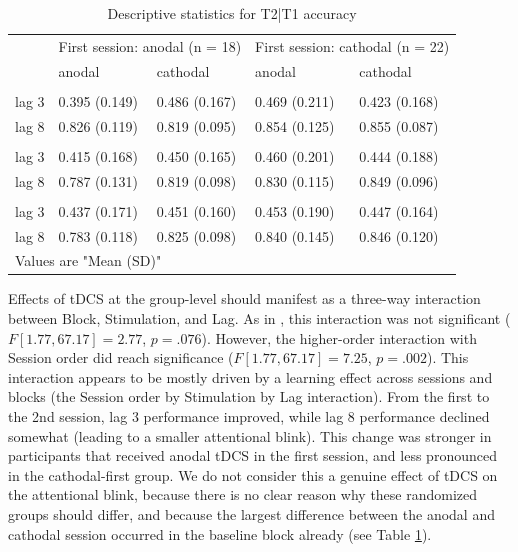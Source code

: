 \documentclass[11pt,english,]{memoir}
\begin{document}
\begin{table}[t]

\caption{\label{tab:tab-descriptives-T2}Descriptive statistics for T2|T1 accuracy}
\centering
\fontsize{10}{12}\selectfont
\begin{tabular}{lllll}
\toprule
\multicolumn{1}{c}{ } & \multicolumn{2}{c}{First session: anodal (n = 18)} & \multicolumn{2}{c}{First session: cathodal (n = 22)} \\
\cmidrule(l{3pt}r{3pt}){2-3} \cmidrule(l{3pt}r{3pt}){4-5}
 & anodal & cathodal & anodal & cathodal\\
\midrule
\addlinespace[0.3em]
\multicolumn{5}{l}{\textbf{baseline}}\\
\hspace{1em}lag 3 & 0.395 (0.149) & 0.486 (0.167) & 0.469 (0.211) & 0.423 (0.168)\\
\hspace{1em}lag 8 & 0.826 (0.119) & 0.819 (0.095) & 0.854 (0.125) & 0.855 (0.087)\\
\addlinespace[0.3em]
\multicolumn{5}{l}{\textbf{tDCS}}\\
\hspace{1em}lag 3 & 0.415 (0.168) & 0.450 (0.165) & 0.460 (0.201) & 0.444 (0.188)\\
\hspace{1em}lag 8 & 0.787 (0.131) & 0.819 (0.098) & 0.830 (0.115) & 0.849 (0.096)\\
\addlinespace[0.3em]
\multicolumn{5}{l}{\textbf{post}}\\
\hspace{1em}lag 3 & 0.437 (0.171) & 0.451 (0.160) & 0.453 (0.190) & 0.447 (0.164)\\
\hspace{1em}lag 8 & 0.783 (0.118) & 0.825 (0.098) & 0.840 (0.145) & 0.846 (0.120)\\
\bottomrule
\multicolumn{5}{l}{Values are "Mean (SD)"}\\
\end{tabular}
\end{table}

Effects of tDCS at the group-level should manifest as a three-way interaction between Block, Stimulation, and Lag. As in \textcite{London2015}, this interaction was not significant (\(F[1.77, 67.17] = 2.77\), \(p = .076\)). However, the higher-order interaction with Session order did reach significance (\(F[1.77, 67.17] = 7.25\), \(p = .002\)). This interaction appears to be mostly driven by a learning effect across sessions and blocks (the Session order by Stimulation by Lag interaction). From the first to the 2nd session, lag 3 performance improved, while lag 8 performance declined somewhat (leading to a smaller attentional blink). This change was stronger in participants that received anodal tDCS in the first session, and less pronounced in the cathodal-first group. We do not consider this a genuine effect of tDCS on the attentional blink, because there is no clear reason why these randomized groups should differ, and because the largest difference between the anodal and cathodal session occurred in the baseline block already (see Table \ref{tab:tab-descriptives-T2}).
\end{document}
